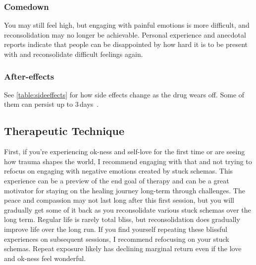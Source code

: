 \documentclass[11pt,oneside]{book}
\let\cite\parencite
\begin{document}
\subsubsection*{Comedown} You may still feel high, but engaging with painful emotions is more difficult, and reconsolidation may no longer be achievable. Personal experience and anecdotal reports indicate that people can be disappointed by how hard it is to be present with and reconsolidate difficult feelings again.

\subsubsection*{After-effects}
See \cref{table:sideeffects} for how side effects change as the drug wears off. Some of them can persist up to 3\,days~\cite{liechtiGender}.

\subsection*{Therapeutic Technique}
First, if you're experiencing ok-ness and self-love for the first time or are seeing how trauma shapes the world, I recommend engaging with that and not trying to refocus on engaging with negative emotions created by stuck schemas. This experience can be a preview of the end goal of therapy and can be a great motivator for staying on the healing journey long-term through challenges. The peace and compassion may not last long after this first session, but you will gradually get some of it back as you reconsolidate various stuck schemas over the long term. Regular life is rarely total bliss, but reconsolidation does gradually improve life over the long run. If you find yourself repeating these blissful experiences on subsequent sessions, I recommend refocusing on your stuck schemas. Repeat exposure likely has declining marginal return even if the love and ok-ness feel wonderful.
\end{document}
